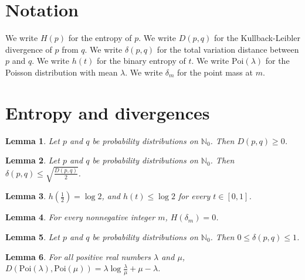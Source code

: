 \documentclass{article}
\newtheorem{lemma}{Lemma}
\begin{document}
\section{Notation}

We write $H(p)$ for the entropy of $p$.
We write $D(p,q)$ for the Kullback-Leibler divergence of $p$ from $q$.
We write $\delta(p,q)$ for the total variation distance between $p$ and $q$.
We write $h(t)$ for the binary entropy of $t$.
We write $\mathrm{Poi}(\lambda)$ for the Poisson distribution with mean $\lambda$.
We write $\delta_m$ for the point mass at $m$.

\section{Entropy and divergences}

\begin{lemma}\label{gibbs}
Let $p$ and $q$ be probability distributions on $\mathbb{N}_0$. Then $D(p,q)\ge0$.
\end{lemma}

\begin{lemma}\label{pinsker}
Let $p$ and $q$ be probability distributions on $\mathbb{N}_0$. Then $\delta(p,q)\le\sqrt{\frac{D(p,q)}{2}}$.
\end{lemma}

\begin{lemma}\label{binary}
$h(\frac{1}{2})=\log 2$, and $h(t)\le\log 2$ for every $t\in[0,1]$.
\end{lemma}

\begin{lemma}\label{point}
For every nonnegative integer $m$, $H(\delta_m)=0$.
\end{lemma}

\begin{lemma}\label{tv}
Let $p$ and $q$ be probability distributions on $\mathbb{N}_0$. Then $0\le\delta(p,q)\le1$.
\end{lemma}

\begin{lemma}\label{poisson}
For all positive real numbers $\lambda$ and $\mu$, $D(\mathrm{Poi}(\lambda),\mathrm{Poi}(\mu))=\lambda\log\frac{\lambda}{\mu}+\mu-\lambda$.
\end{lemma}
\end{document}
